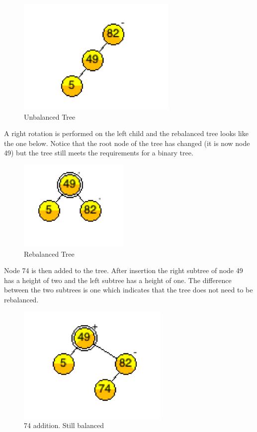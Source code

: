 \begin{figure}[H]
\centering
\includegraphics{pictures/tree1.png}
\caption{Unbalanced Tree}
\label{fig:tree1}
\end{figure}

A right rotation is performed on the left child and the rebalanced tree looks like the one below. Notice that the root node of the tree has changed (it is now node 49) but the tree still meets the requirements for a binary tree.

\begin{figure}[H]
\centering
\includegraphics{pictures/tree2.png}
\caption{Rebalanced Tree}
\label{fig:tree2}
\end{figure}

Node 74 is then added to the tree. After insertion the right subtree of node 49 has a height of two and the left subtree has a height of one. The difference between the two subtrees is one which indicates that the tree does not need to be rebalanced.

\begin{figure}[H]
\centering
\includegraphics{pictures/tree3.png}
\caption{74 addition. Still balanced}
\label{fig:tree3}
\end{figure}

